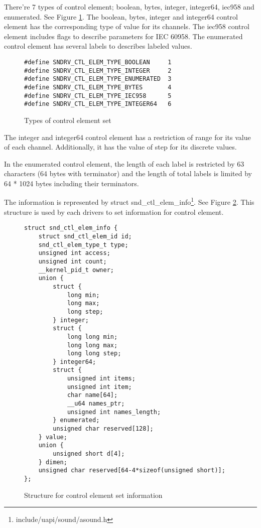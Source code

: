 \documentclass[onecolumn]{article}
\begin{document}
There're 7 types of control element; boolean, bytes, integer, integer64, iec958 and enumerated. See Figure \ref{fig:element-set-types}. The boolean, bytes, integer and integer64 control element has the corresponding type of value for its channels. The iec958 control element includes flags to describe parameters for IEC 60958. The enumerated control element has several labels to describes labeled values.

\begin{figure}[htbp]
\small
\begin{verbatim}
#define SNDRV_CTL_ELEM_TYPE_BOOLEAN     1
#define SNDRV_CTL_ELEM_TYPE_INTEGER     2
#define SNDRV_CTL_ELEM_TYPE_ENUMERATED  3
#define SNDRV_CTL_ELEM_TYPE_BYTES       4
#define SNDRV_CTL_ELEM_TYPE_IEC958      5
#define SNDRV_CTL_ELEM_TYPE_INTEGER64   6
\end{verbatim}
\caption{{Types of control element set}}
\label{fig:element-set-types}
\end{figure}

The integer and integer64 control element has a restriction of range for its value of each channel. Additionally, it has the value of step for its discrete values.

In the enumerated control element, the length of each label is restricted by 63 characters (64 bytes with terminator) and the length of total labels is limited by 64 * 1024 bytes including their terminators.

The information is represented by struct snd\_ctl\_elem\_info\footnote{include/uapi/sound/asound.h}. See Figure \ref{fig:element-set-info-structure}. This structure is used by each drivers to set information for control element.

\begin{figure}[htbp]
\small
\begin{verbatim}
struct snd_ctl_elem_info {
    struct snd_ctl_elem_id id;
    snd_ctl_elem_type_t type;
    unsigned int access;
    unsigned int count;
    __kernel_pid_t owner;
    union {
        struct {
            long min;
            long max;
            long step;
        } integer;
        struct {
            long long min;
            long long max;
            long long step;
        } integer64;
        struct {
            unsigned int items;
            unsigned int item;
            char name[64];
            __u64 names_ptr;
            unsigned int names_length;
        } enumerated;
        unsigned char reserved[128];
    } value;
    union {
        unsigned short d[4];
    } dimen;
    unsigned char reserved[64-4*sizeof(unsigned short)];
};
\end{verbatim}
\caption{{Structure for control element set information}}
\label{fig:element-set-info-structure}
\end{figure}
\end{document}
